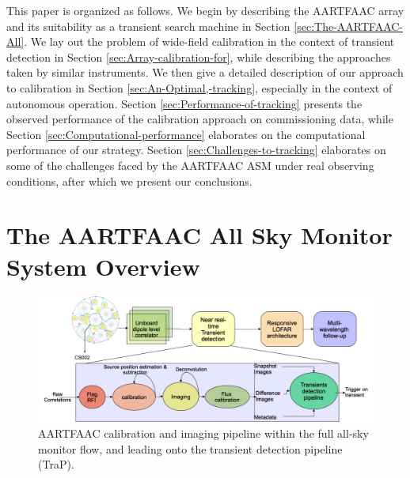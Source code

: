 \documentclass{aa}
\begin{document}
This paper is  organized as follows.  We begin by  describing the AARTFAAC array
and   its    suitability   as   a   transient   search    machine   in   Section
\ref{sec:The-AARTFAAC-All}. We lay out  the problem of wide-field calibration in
the context  of transient detection  in Section \ref{sec:Array-calibration-for},
while describing  the approaches taken by  similar instruments.  We  then give a
detailed   description    of   our   approach   to    calibration   in   Section
\ref{sec:An-Optimal,-tracking},   especially  in   the  context   of  autonomous
operation.   Section  \ref{sec:Performance-of-tracking}  presents  the  observed
performance  of the calibration  approach on  commissioning data,  while Section
\ref{sec:Computational-performance} elaborates  on the computational performance
of our strategy.  Section \ref{sec:Challenges-to-tracking} elaborates on some of
the challenges faced by the  AARTFAAC ASM under real observing conditions, after
which we present our conclusions.


\section{\label{sec:The-AARTFAAC-All}The AARTFAAC All Sky Monitor System
Overview} 

\begin{figure}[htbp]
\centering
\includegraphics[width=1\textwidth]{Figs/AFAAC_blkdia_latest.png}
\caption{AARTFAAC  calibration  and imaging  pipeline  within  the full  all-sky
  monitor flow, and leading onto the transient detection pipeline (TraP).}
\label{fig:The-AARTFAAC-calibration}
\end{figure}
\end{document}
